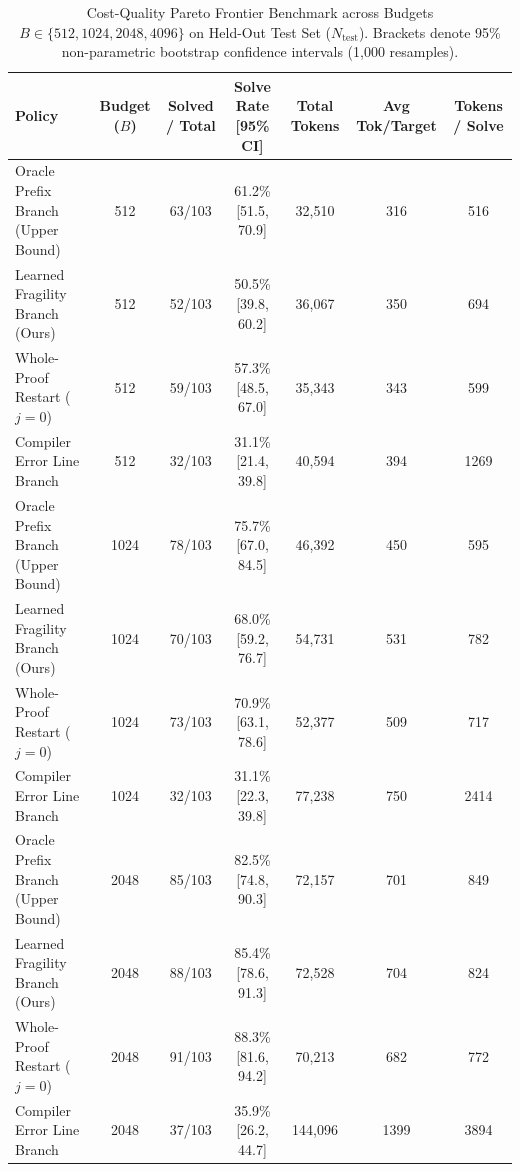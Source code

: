 \begin{table}[t]
\centering
\small
\begin{tabular}{lcccccc}
\toprule
\textbf{Policy} & \textbf{Budget ($B$)} & \textbf{Solved / Total} & \textbf{Solve Rate [95\% CI]} & \textbf{Total Tokens} & \textbf{Avg Tok/Target} & \textbf{Tokens / Solve} \\
\midrule
Oracle Prefix Branch (Upper Bound) & 512 & 63/103 & 61.2\% [51.5, 70.9] & 32,510 & 316 & 516 \\
Learned Fragility Branch (Ours) & 512 & 52/103 & 50.5\% [39.8, 60.2] & 36,067 & 350 & 694 \\
Whole-Proof Restart ($j=0$) & 512 & 59/103 & 57.3\% [48.5, 67.0] & 35,343 & 343 & 599 \\
Compiler Error Line Branch & 512 & 32/103 & 31.1\% [21.4, 39.8] & 40,594 & 394 & 1269 \\
\midrule
Oracle Prefix Branch (Upper Bound) & 1024 & 78/103 & 75.7\% [67.0, 84.5] & 46,392 & 450 & 595 \\
Learned Fragility Branch (Ours) & 1024 & 70/103 & 68.0\% [59.2, 76.7] & 54,731 & 531 & 782 \\
Whole-Proof Restart ($j=0$) & 1024 & 73/103 & 70.9\% [63.1, 78.6] & 52,377 & 509 & 717 \\
Compiler Error Line Branch & 1024 & 32/103 & 31.1\% [22.3, 39.8] & 77,238 & 750 & 2414 \\
\midrule
Oracle Prefix Branch (Upper Bound) & 2048 & 85/103 & 82.5\% [74.8, 90.3] & 72,157 & 701 & 849 \\
Learned Fragility Branch (Ours) & 2048 & 88/103 & 85.4\% [78.6, 91.3] & 72,528 & 704 & 824 \\
Whole-Proof Restart ($j=0$) & 2048 & 91/103 & 88.3\% [81.6, 94.2] & 70,213 & 682 & 772 \\
Compiler Error Line Branch & 2048 & 37/103 & 35.9\% [26.2, 44.7] & 144,096 & 1399 & 3894 \\
\bottomrule
\end{tabular}
\caption{Cost-Quality Pareto Frontier Benchmark across Budgets $B \in \{512, 1024, 2048, 4096\}$ on Held-Out Test Set ($N_{\text{test}}$). Brackets denote 95\% non-parametric bootstrap confidence intervals (1,000 resamples).}
\label{tab:exp1_pareto_frontier}
\end{table}
